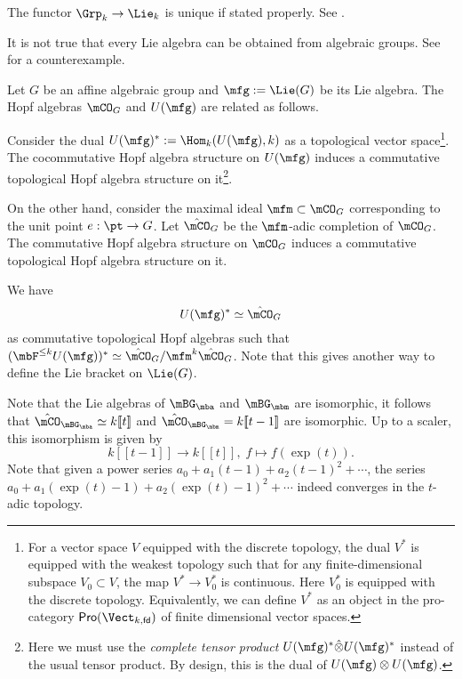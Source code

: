 \begin{rem}
	The functor $\Grp_k \to \Lie_k$ is unique if stated properly. See \cite[Theorem 10.23]{M}.
\end{rem}

\begin{warn}
	It is not true that every Lie algebra can be obtained from algebraic groups. See \cite[I, \S 5, Exercise 6]{Bou} for a counterexample.
\end{warn}

\begin{rem}
	Let $G$ be an affine algebraic group and $\mfg:=\Lie(G)$ be its Lie algebra. The Hopf algebras $\mCO_G$ and $U(\mfg)$ are related as follows.

	Consider the dual $U(\mfg)^*:=\Hom_k(U(\mfg),k)$ as a topological vector space\footnote{For a vector space $V$ equipped with the discrete topology, the dual $V^*$ is equipped with the weakest topology such that for any finite-dimensional subspace $V_0\subset V$, the map $V^*\to V_0^*$ is continuous. Here $V_0^*$ is equipped with the discrete topology. Equivalently, we can define $V^*$ as an object in the pro-category $\mathsf{Pro}(\Vect_{k,\mathsf{fd}})$ of finite dimensional vector spaces.}. The cocommutative Hopf algebra structure on $U(\mfg)$ induces a commutative topological Hopf algebra structure on it\footnote{Here we must use the \emph{complete tensor product} $U(\mfg)^* \hat\otimes U(\mfg)^*$ instead of the usual tensor product. By design, this is the dual of $U(\mfg)\ot U(\mfg)$.
	}.

	On the other hand, consider the maximal ideal $\mfm\subset \mCO_G$ corresponding to the unit point $e:\pt \to G$. Let $\hat\mCO_G$ be the $\mfm$-adic completion of $\mCO_G$. The commutative Hopf algebra structure on $\mCO_G$ induces a commutative topological Hopf algebra structure on it.

	We have
	\[
		U(\mfg)^* \simeq \hat\mCO_G
	\]
	as commutative topological Hopf algebras such that $(\mbF^{\le k}U(\mfg))^* \simeq  \hat\mCO_G/\mfm^k\hat\mCO_G$. Note that this gives another way to define the Lie bracket on $\Lie(G)$.
\end{rem}

\begin{exam}
	Note that the Lie algebras of $\mBG_\mba$ and $\mBG_\mbm$ are isomorphic, it follows that $\hat\mCO_{\mBG_\mba} \simeq k[\![t]\!]$ and $\hat\mCO_{\mBG_\mbm}=k[\![t-1]\!]$ are isomorphic. Up to a scaler, this isomorphism is given by
	\[
		k[\![t-1]\!]\to k[\![t]\!],\; f\mapsto f(\exp(t)).
	\]
	Note that given a power series $a_0+a_1(t-1)+a_2(t-1)^2+\cdots$, the series $a_0+a_1(\exp(t)-1)+a_2(\exp(t)-1)^2+\cdots$ indeed converges in the $t$-adic topology.
	
\end{exam}

